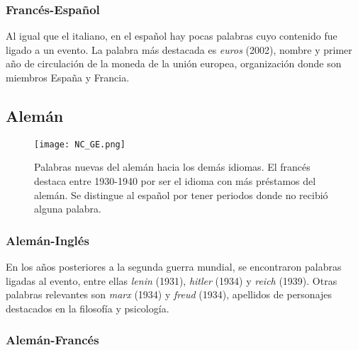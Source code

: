 \subsubsection*{Francés-Español}%

Al igual que el italiano, en el español hay pocas palabras cuyo contenido fue ligado a un evento. La palabra más destacada es \textit{euros} (2002),
nombre y primer año de circulación de la moneda de la unión europea, organización donde son miembros España y Francia. 



\subsection{Alemán}%

\begin{figure}[h!]
	\centering
	\texttt{[image: NC\_GE.png]}
	\label{fig.NC_GE}
	\caption{Palabras nuevas del alemán hacia los demás idiomas. El francés destaca  entre 1930-1940 por ser el idioma con más préstamos del alemán. Se distingue al español por tener periodos donde no recibió alguna palabra.}  
\end{figure}




\subsubsection*{Alemán-Inglés}%

En los años posteriores a la segunda guerra mundial, se encontraron palabras ligadas al evento, entre ellas \textit{lenin} (1931), \textit{hitler} (1934) y \textit{reich} (1939).  Otras palabras relevantes son \textit{marx} (1934) y \textit{freud} (1934), apellidos de personajes destacados en la filosofía y psicología. 


\subsubsection*{Alemán-Francés}%

